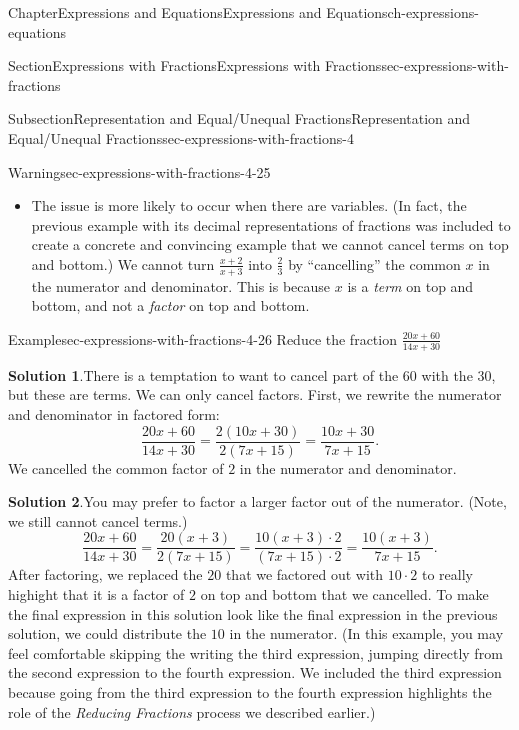 \documentclass[twoside,11pt,]{book}
\newcommand{\blocktitlefont}{\relax}
\numberwithin{equation}{chapter}
\begin{document}
\begin{chapterptx}{Chapter}{Expressions and Equations}{}{Expressions and Equations}{}{}{ch-expressions-equations}
\begin{sectionptx}{Section}{Expressions with Fractions}{}{Expressions with Fractions}{}{}{sec-expressions-with-fractions}
\begin{subsectionptx}{Subsection}{Representation and Equal\slash{}Unequal Fractions}{}{Representation and Equal\slash{}Unequal Fractions}{}{}{sec-expressions-with-fractions-4}
\begin{warning}{Warning}{}{sec-expressions-with-fractions-4-25}
\begin{itemize}[label=\textbullet]
\item{}The issue is more likely to occur when there are variables. (In fact, the previous example with its decimal representations of fractions was included to create a concrete and convincing example that we cannot cancel terms on top and bottom.) We cannot turn \(\frac{x+2}{x+3}\) into \(\frac{2}{3}\) by ``cancelling'' the common \(x\) in the numerator and denominator. This is because \(x\) is a \emph{term} on top and bottom, and not a \emph{factor} on top and bottom.%
\end{itemize}
%
\end{warning}
\begin{example}{Example}{}{sec-expressions-with-fractions-4-26}%
Reduce the fraction \(\frac{20x+60}{14x+30}\)%
\par\smallskip%
\noindent\textbf{\blocktitlefont Solution 1}.\hypertarget{sec-expressions-with-fractions-4-26-2}{}\quad{}There is a temptation to want to cancel part of the \(60\) with the \(30\), but these are terms. We can only cancel factors. First, we rewrite the numerator and denominator in factored form:%
\begin{equation*}
\frac{20x+60}{14x+30}=\frac{2(10x+30)}{2(7x+15)}=\frac{10x+30}{7x+15}.
\end{equation*}
We cancelled the common factor of \(2\) in the numerator and denominator.%
\par\smallskip%
\noindent\textbf{\blocktitlefont Solution 2}.\hypertarget{sec-expressions-with-fractions-4-26-3}{}\quad{}You may prefer to factor a larger factor out of the numerator. (Note, we still cannot cancel terms.)%
\begin{equation*}
\frac{20x+60}{14x+30}=\frac{20(x+3)}{2(7x+15)}= \frac{10(x+3) \cdot 2}{(7x+15) \cdot 2} = \frac{10(x+3)}{7x+15}.
\end{equation*}
After factoring, we replaced the \(20\) that we factored out with \(10\cdot 2\) to really highight that it is a factor of \(2\) on top and bottom that we cancelled. To make the final expression in this solution look like the final expression in the previous solution, we could distribute the \(10\) in the numerator. (In this example, you may feel comfortable skipping the writing the third expression, jumping directly from the second expression to the fourth expression. We included the third expression because going from the third expression to the fourth expression highlights the role of the \emph{Reducing Fractions} process we described earlier.)%
\end{example}
\end{subsectionptx}

\end{sectionptx}
\end{chapterptx}
\end{document}
